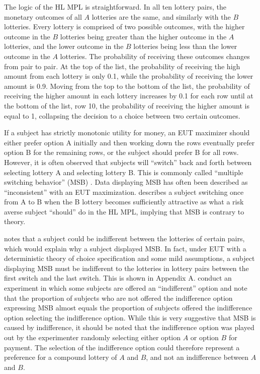 \documentclass[11pt,a4paper]{report}
\begin{document}
The logic of the HL MPL is straightforward.
In all ten lottery pairs, the monetary outcomes of all $A$ lotteries are the same, and similarly with the $B$ lotteries.
Every lottery is comprised of two possible outcomes, with the higher outcome in the $B$ lotteries being greater than the higher outcome in the $A$ lotteries, and the lower outcome in the $B$ lotteries being less than the lower outcome in the $A$ lotteries.
The probability of receiving these outcomes changes from pair to pair.
At the top of the list, the probability of receiving the high amount from each lottery is only 0.1, while the probability of receiving the lower amount is 0.9.
Moving from the top to the bottom of the list, the probability of receiving the higher amount in each lottery increases by 0.1 for each row until at the bottom of the list, row 10, the probability of receiving the higher amount is equal to 1, collapsing the decision to a choice between two certain outcomes.


If a subject has strictly monotonic utility for money, an EUT maximizer should either prefer option A initially and then working down the rows eventually prefer option B for the remaining rows, or the subject should prefer B for all rows.
However, it is often observed that subjects will \enquote{switch} back and forth between selecting lottery A and selecting lottery B.
This is commonly called \enquote{multiple switching behavior} (MSB) \parencite{Bruner2011}.
Data displaying MSB has often been described as \enquote{inconsistent} with an EUT maximization.
\textcite[1645]{Holt2002} describes a subject switching once from A to B when the B lottery becomes sufficiently attractive as what a risk averse subject \enquote{should} do in the HL MPL, implying that MSB is contrary to theory.


\textcite[347]{Harrison2007} notes that a subject could be indifferent between the lotteries of certain pairs, which would explain why a subject displayed MSB.
In fact, under EUT with a deterministic theory of choice specification and some mild assumptions, a subject displaying MSB must be indifferent to the lotteries in lottery pairs between the first switch and the last switch.
This is shown in Appendix A.
\textcite{Harrison2007} conduct an experiment in which some subjects are offered an \enquote{indifferent} option and note that the proportion of subjects who are not offered the indifference option expressing MSB almost equals the proportion of subjects offered the indifference option  selecting the indifference option.
While this is very suggestive that MSB is caused by indifference, it should be noted that the indifference option was played out by the experimenter randomly selecting either option $A$ or option $B$ for payment.
The selection of the indifference option could therefore represent a preference for a compound lottery of $A$ and $B$, and not an indifference between $A$ and $B$.
\end{document}
